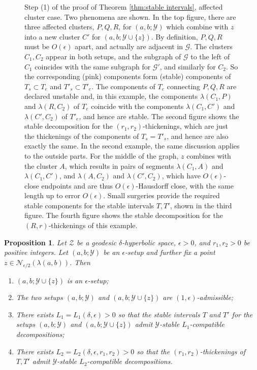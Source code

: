 \documentclass[10pt,a4paper]{amsart}
\newtheorem{proposition}{Proposition}
\newcommand{\calG}{\mathcal{G}}
\newcommand{\calN}{\mathcal{N}}
\newcommand{\calY}{\mathcal{Y}}
\newcommand{\calZ}{\mathcal{Z}}
\begin{document}
\begin{figure}[!htb]
    \centering
    
    \caption{Step (1) of the proof of Theorem \ref{thm:stable intervals}, affected cluster case.  Two phenomena are shown.  In the top figure, there are three affected clusters, $P,Q,R$, for $(a,b;\calY)$ which combine with $z$ into a new cluster $C'$ for $(a,b;\calY \cup \{z\})$.  By definition, $P,Q,R$ must be $O(\epsilon)$ apart, and actually are adjacent in $\calG$.  The clusters $C_1,C_2$ appear in both setups, and the subgraph of $\calG$ to the left of $C_1$ coincides with the same subgraph for $\calG'$, and similarly for $C_2$.  So the corresponding (pink) components form (stable) components of $T_s \subset T_e$ and $T'_s \subset T'_e$.  The components of $T_e$ connecting $P,Q,R$ are declared unstable and, in this example, the components $\lambda(C_1,P)$ and $\lambda(R,C_2)$ of $T_e$ coincide with the components $\lambda(C_1,C')$ and $\lambda(C',C_2)$ of $T'_e$, and hence are stable.  The second figure shows the stable decomposition for the $(r_1,r_2)$-thickenings, which are just the thickenings of the components of $T_s = T'_s$, and hence are also exactly the same.  In the second example, the same discussion applies to the outside parts.  For the middle of the graph, $z$ combines with the cluster $A$, which results in pairs of segments $\lambda(C_1,A)$ and $\lambda(C_1, C')$, and $\lambda(A,C_2)$ and $\lambda(C',C_2)$, which have $O(\epsilon)$-close endpoints and are thus $O(\epsilon)$-Hausdorff close, with the same length up to error $O(\epsilon)$.  Small surgeries provide the required stable components for the stable intervals $T, T'$, shown in the third figure.  The fourth figure shows the stable decomposition for the $(R,r)$-thickenings of this example.}
    \label{fig:affected cluster}
\end{figure}

\begin{proposition} \label{prop:add cluster}
Let $\calZ$ be a geodesic $\delta$-hyperbolic space, $\epsilon>0$, and $r_1,r_2>0$ be positive integers.  Let $(a,b;\calY)$ be an $\epsilon$-setup and further fix a point $z \in \calN_{\epsilon/2}(\lambda(a,b))$.  Then
\begin{enumerate}
\item $(a,b;\calY \cup \{z\})$ is an $\epsilon$-setup;
\item The two setups $(a,b;\calY)$ and $(a,b;\calY \cup \{z\})$ are $(1,\epsilon)$-admissible;
\item There exists $L_1=L_1(\delta, \epsilon)>0$ so that the stable intervals $T$ and $T'$ for the setups $(a,b;\calY)$ and $(a,b;\calY \cup \{z\})$ admit $\calY$-stable $L_1$-compatible decompositions;
\item There exists $L_2 = L_2(\delta, \epsilon, r_1,r_2)>0$ so that the $(r_1,r_2)$-thickenings of $T,T'$ admit $\calY$-stable $L_2$-compatible decompositions.
\end{enumerate}
\end{proposition}
\end{document}
